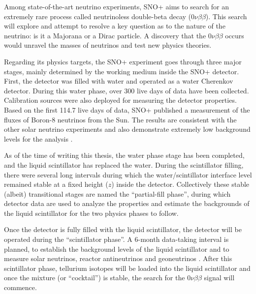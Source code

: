 
Among state-of-the-art neutrino experiments, SNO+ aims to search for an extremely rare process called neutrinoless double-beta decay ($0\nu\beta\beta$). This search will explore and attempt to resolve a key question as to the nature of the neutrino: is it a Majorana or a Dirac particle. A discovery that the $0\nu\beta\beta$ occurs would unravel the masses of neutrinos and test new physics theories.

Regarding its physics targets, the SNO+ experiment goes through three major stages, mainly determined by the working medium inside the SNO+ detector. First, the detector was filled with water and operated as a water Cherenkov detector. During this water phase, over 300 live days of data have been collected. Calibration sources were also deployed for measuring the detector properties. Based on the first 114.7 live days of data, SNO+ published a measurement of the fluxes of Boron-8 neutrinos from the Sun. The results are consistent with the other solar neutrino experiments and also demonstrate extremely low background levels for the analysis \cite{anderson2019measurement}.

As of the time of writing this thesis, the water phase stage has been completed, and the liquid scintillator has replaced the water. During the scintillator filling, there were several long intervals during which the water/scintillator interface level remained stable at a fixed height ($z$) inside the detector. Collectively these stable (albeit) transitional stages are named the ``partial-fill phase'', during which detector data are used to analyze the properties and estimate the backgrounds of the liquid scintillator for the two physics phases to follow.

Once the detector is fully filled with the liquid scintillator, the detector will be operated during the ``scintillator phase''. A 6-month data-taking interval is planned, to establish the background levels of the liquid scintillator and to measure solar neutrinos, reactor antineutrinos and geoneutrinos \cite{directorReview}. After this scintillator phase, tellurium isotopes will be loaded into the liquid scintillator and once the mixture (or ``cocktail'') is stable, the search for the $0\nu\beta\beta$ signal will commence.

